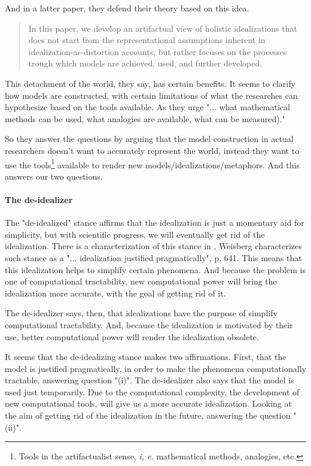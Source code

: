 And in a latter paper, they defend their theory based on this idea.

\begin{quote}
    In this paper, we develop an artifactual view of holistic idealizations that does not start from the representational assumptions inherent in idealization-as-distortion accounts, but rather focuses on the processes trough which models are achieved, used, and further developed. \parencite[][p. 50]{Carrillo2022}
\end{quote}
 
This detachment of the world, they say, has certain benefits.
It seems to clarify how models are constructed, with certain limitations of what the researches can hypothesize based on the tools available.
As they urge "$\ldots$ what  mathematical methods can be used, what analogies are available, what can be measured)." \parencite[][p. 9]{Carrillo2021-CARAAP-12}

So they answer the questions by arguing that the model construction in actual researchers doesn't want to accurately represent the world, instead they want to use the tools\footnote{Tools in the artifactualist sense, \emph{i, e.} mathematical methods, analogies, etc.} available to render new models/idealizations/metaphors.
And this answers our two questions.

\paragraph{The de-idealizer}

The "de-idealized" stance affirms that the idealization is just a momentary aid for simplicity, but with scientific progress, we will eventually get rid of the idealization.
There is a characterization of this stance in \parencite{Weisberg2007}, Weisberg characterizes such stance as a "$\ldots$ idealization justified pragmatically", p. 641.
This means that this idealization helps to simplify certain phenomena.
And because the problem is one of computational tractability, new computational power will bring the idealization more accurate, with the goal of getting rid of it.

The de-idealizer says, then, that idealizations have the purpose of simplify computational tractability.
And, because the idealization is motivated by their use, better computational power will render the idealization obsolete.

It seems that the de-idealizing stance makes two affirmations.
First, that the model is justified pragmatically, in order to make the phenomena computationally tractable, answering question "(i)".
The de-idealizer also says that the model is used just temporarily.
Due to the computational complexity, the development of new computational tools, will give us a more accurate idealization.
Looking at the aim of getting rid of the idealization in the future, answering the question "(ii)".

